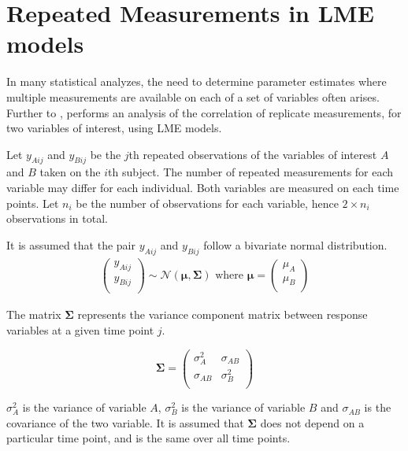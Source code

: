 \documentclass[12pt, a4paper]{report}
\theoremstyle{plain}
\theoremstyle{definition}
\theoremstyle{remark}
\begin{document}
%



\section{Repeated Measurements in LME models}

In many statistical analyzes, the need to determine parameter estimates where multiple measurements are available on each of a set of variables often arises. Further to \citet{lam}, \citet{hamlett} performs an analysis of the correlation of replicate measurements, for two variables of interest, using LME models.

Let $y_{Aij}$ and $y_{Bij}$ be the $j$th repeated observations of the variables of interest $A$ and $B$ taken on the $i$th subject. The number of repeated measurements for each variable may differ for each individual.
Both variables are measured on each time points. Let $n_{i}$ be the number of observations for each variable, hence $2\times n_{i}$ observations in total.

It is assumed that the pair $y_{Aij}$ and $y_{Bij}$ follow a bivariate normal distribution.
\begin{eqnarray*}
\left(
\begin{array}{c}
y_{Aij} \\
y_{Bij} \\
\end{array}
\right) \sim \mathcal{N}(
\boldsymbol{\mu}, \boldsymbol{\Sigma})\mbox{   where } \boldsymbol{\mu} = \left(
\begin{array}{c}
\mu_{A} \\
\mu_{B} \\
\end{array}
\right)
\end{eqnarray*}

The matrix $\boldsymbol{\Sigma}$ represents the variance component matrix between response variables at a given time point $j$.

\[
\boldsymbol{\Sigma} = \left( \begin{array}{cc}
\sigma^2_{A} & \sigma_{AB} \\
\sigma_{AB} & \sigma^2_{B}\\
\end{array}   \right)
\]

$\sigma^2_{A}$ is the variance of variable $A$, $\sigma^2_{B}$ is the variance of variable $B$ and $\sigma_{AB}$ is the covariance of the two variable. It is assumed that $\boldsymbol{\Sigma}$ does not depend on a particular time point, and is the same over all time points.
\end{document}
